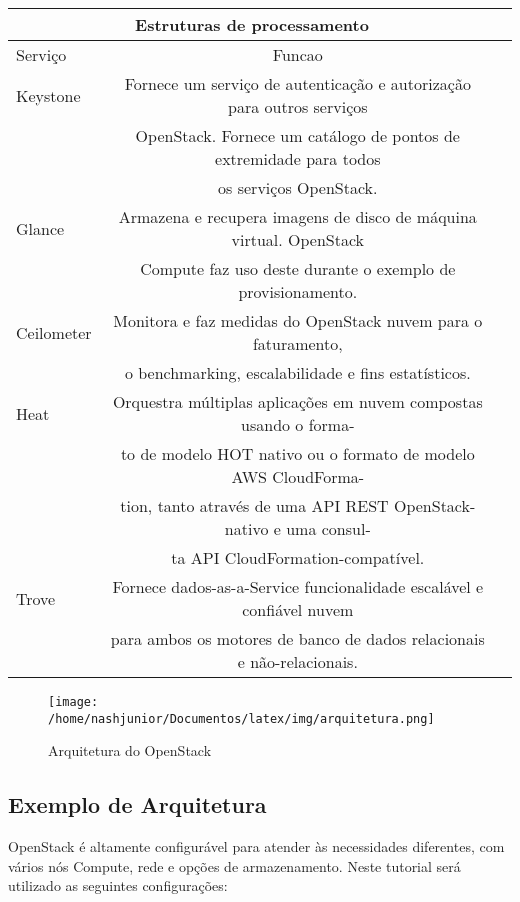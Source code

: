\documentclass[a4paper]{book}
\begin{document}
			\begin{center}
				\begin{tabular}{|l||c|c|}
				\hline
				\multicolumn{2}{|c|}{\textbf{Estruturas de processamento}}\\
				\hline
				Serviço		&Funcao\\
				\hline \hline
				Keystone& Fornece um serviço de autenticação e autorização para outros serviços\\& OpenStack. Fornece um catálogo de pontos de extremidade para todos\\& os serviços OpenStack.\\
				\hline \hline
				Glance&	Armazena e recupera imagens de disco de máquina virtual. OpenStack\\& Compute faz uso deste durante o exemplo de provisionamento.\\
				\hline \hline
				Ceilometer& 
Monitora e faz medidas do OpenStack nuvem para o faturamento,\\& o benchmarking,
escalabilidade e fins estatísticos.\\
				\hline \hline
				Heat& Orquestra múltiplas aplicações em nuvem compostas usando o forma-\\&to de modelo HOT nativo ou o formato de modelo AWS CloudForma-\\&tion, tanto através de uma API REST OpenStack-nativo e uma consul-\\&ta API CloudFormation-compatível.\\
				\hline \hline
				Trove&	Fornece dados-as-a-Service funcionalidade escalável e confiável nuvem\\& para ambos os motores de banco de dados relacionais e não-relacionais.
				\end{tabular}
			\end{center}
			
		\begin{figure}

			\texttt{[image: /home/nashjunior/Documentos/latex/img/arquitetura.png]}
			\caption{Arquitetura do OpenStack}
		\end{figure}

		\subsection{Exemplo de Arquitetura}
		OpenStack é altamente configurável para atender às necessidades diferentes, com vários nós Compute, rede e opções de armazenamento. Neste tutorial será utilizado as seguintes configurações:
		
\end{document}

